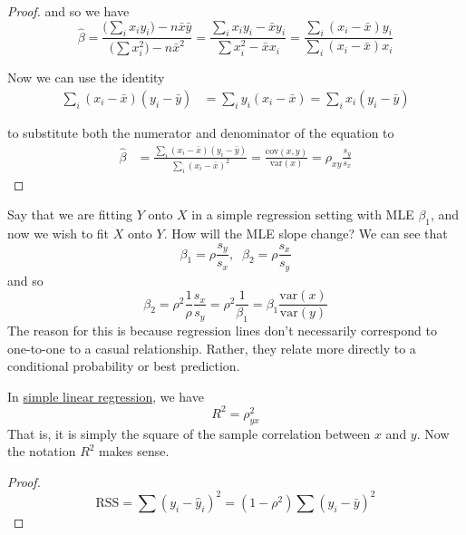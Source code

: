 \begin{proof}
    and so we have 
    \begin{equation}
      \hat{\beta} = \frac{ \big( \sum_i x_i y_i \big) - n \bar{x}\bar{y}}{\big( \sum x_i^2 \big) - n \bar{x}^2} = \frac{ \sum_i x_i y_i - \bar{x} y_i}{\sum x_i^2 - \bar{x} x_i} = \frac{ \sum_i (x_i - \bar{x}) y_i}{\sum_i (x_i - \bar{x}) x_i}
    \end{equation}

    Now we can use the identity
    \begin{align}
      \sum_{i} (x_i - \bar{x}) (y_i - \bar{y}) & = \sum_i y_i (x_i - \bar{x}) = \sum_i x_i (y_i - \bar{y}) 
    \end{align}

    to substitute both the numerator and denominator of the equation to 
    \begin{align}
      \hat{\beta} & = \frac{\sum_i (x_i - \bar{x}) (y_i - \bar{y})}{\sum_i (x_i - \bar{x})^2} = \frac{\mathrm{cov}(x, y)}{\mathrm{var}(x)} = \rho_{xy} \frac{s_y}{s_x}
    \end{align}
  \end{proof}

  \begin{example}
    \label{ex:switching-variables}
    Say that we are fitting $Y$ onto $X$ in a simple regression setting with MLE $\beta_1$, and now we wish to fit $X$ onto $Y$. How will the MLE slope change? We can see that 
    \begin{equation}
      \beta_1 = \rho \frac{s_y}{s_x} , \;\; \beta_2 = \rho \frac{s_x}{s_y}
    \end{equation}
    and so 
    \begin{equation}
      \beta_2 = \rho^2 \frac{1}{\rho} \frac{s_x}{s_y} = \rho^2 \frac{1}{\beta_1} = \beta_1 \frac{\mathrm{var}(x)}{\mathrm{var}(y)}
    \end{equation}
    The reason for this is because regression lines don't necessarily correspond to one-to-one to a casual relationship. Rather, they relate more directly to a conditional probability or best prediction. 
  \end{example}

  \begin{theorem}
    \label{thm:coefficient-of-determination}
    In \hyperref[def:simple-linear-regression]{simple linear regression}, we have 
    \begin{equation}
      R^2 = \rho_{yx}^2
    \end{equation}
    That is, it is simply the square of the sample correlation between $x$ and $y$. Now the notation $R^2$ makes sense. 
  \end{theorem}
  \begin{proof}
    \begin{equation}
      \mathrm{RSS} = \sum (y_i - \hat{y}_i)^2 = (1 - \rho^2) \sum (y_i - \bar{y})^2 
    \end{equation}
  \end{proof}

